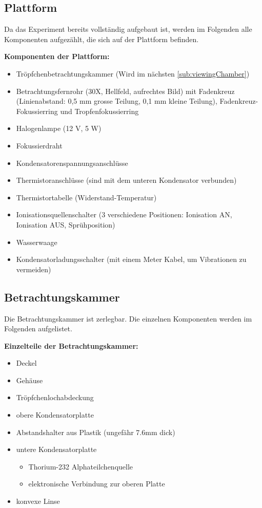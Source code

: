 \subsection{Plattform}\label{sub:inhaltApparatur}
Da das Experiment bereits vollständig aufgebaut ist, werden im Folgenden alle Komponenten aufgezählt, die sich auf der Plattform befinden.

\noindent \textbf{Komponenten der Plattform:}

\begin{itemize}\label{item:apparatur}
	\item Tröpfchenbetrachtungskammer (Wird im nächsten \autoref{sub:viewingChamber})
	\item Betrachtungsfernrohr (30X, Hellfeld, aufrechtes Bild) mit Fadenkreuz (Linienabstand: 0,5 mm grosse Teilung, 0,1 mm kleine Teilung), Fadenkreuz-Fokussierring und Tropfenfokussierring
	\item Halogenlampe (12 V, 5 W)
	\item Fokussierdraht
	\item Kondensatorenspannungsanschlüsse
	\item Thermistoranschlüsse (sind mit dem unteren Kondensator verbunden)
	\item Thermistortabelle (Widerstand-Temperatur)
	\item Ionisationsquellenschalter (3 verschiedene Positionen: Ionisation AN, Ionisation AUS, Sprühposition)
	\item Wasserwaage
	\item Kondensatorladungsschalter (mit einem Meter Kabel, um Vibrationen zu vermeiden)
\end{itemize}


\subsection{Betrachtungskammer}\label{sub:viewingChamber}
Die Betrachtungskammer ist zerlegbar. Die einzelnen Komponenten werden im Folgenden aufgelistet.

\noindent \textbf{Einzelteile der Betrachtungskammer:}

\begin{itemize}\label{item:betrachtungskammer}
	\item Deckel
	\item Gehäuse
	\item Tröpfchenlochabdeckung
	\item obere Kondensatorplatte
	\item Abstandshalter aus Plastik (ungefähr 7.6mm dick)
	\item untere Kondensatorplatte
	\begin{itemize}
		\item Thorium-232 Alphateilchenquelle
		\item elektronische Verbindung zur oberen Platte
	\end{itemize}
	\item konvexe Linse
\end{itemize}

